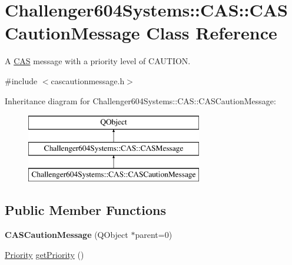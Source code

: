 \hypertarget{class_challenger604_systems_1_1_c_a_s_1_1_c_a_s_caution_message}{\section{Challenger604\-Systems\-:\-:C\-A\-S\-:\-:C\-A\-S\-Caution\-Message Class Reference}
\label{class_challenger604_systems_1_1_c_a_s_1_1_c_a_s_caution_message}
}


A \hyperlink{namespace_challenger604_systems_1_1_c_a_s}{C\-A\-S} message with a priority level of C\-A\-U\-T\-I\-O\-N.  




{\ttfamily \#include $<$cascautionmessage.\-h$>$}

Inheritance diagram for Challenger604\-Systems\-:\-:C\-A\-S\-:\-:C\-A\-S\-Caution\-Message\-:\begin{figure}[H]
\begin{center}
\leavevmode
\includegraphics[height=3.000000cm]{class_challenger604_systems_1_1_c_a_s_1_1_c_a_s_caution_message}
\end{center}
\end{figure}
\subsection*{Public Member Functions}
\begin{DoxyCompactItemize}
\item 
\hypertarget{class_challenger604_systems_1_1_c_a_s_1_1_c_a_s_caution_message_a4bbca2d85275849d77f884c8b0b02d91}{{\bfseries C\-A\-S\-Caution\-Message} (Q\-Object $\ast$parent=0)}\label{class_challenger604_systems_1_1_c_a_s_1_1_c_a_s_caution_message_a4bbca2d85275849d77f884c8b0b02d91}

\item 
\hyperlink{class_challenger604_systems_1_1_c_a_s_1_1_c_a_s_message_a5a503c8cb9618403fcd342dca9ba1ca9}{Priority} \hyperlink{class_challenger604_systems_1_1_c_a_s_1_1_c_a_s_caution_message_af7e93cefbcdd9f9197a4c624c20d5e27}{get\-Priority} ()
\end{DoxyCompactItemize}
